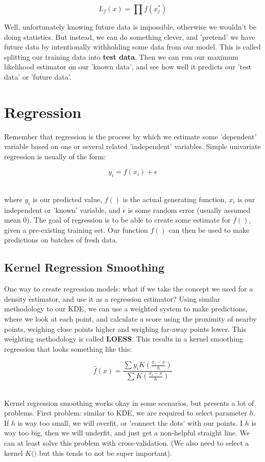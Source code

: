 \documentclass[12pt]{article}
\begin{document}
$$L_f(x) = \prod f(x^*_j)$$ 

Well, unfortunately knowing future data is impossible, otherwise we wouldn't be doing statistics. But instead, we can do something clever, and 'pretend' we have future data by intentionally withholding some data from our model. This is called splitting our training data into \textbf{test data}. Then we can run our maximum likelihood estimator on our 'known data', and see how well it predicts our 'test data' or 'future data'. 

\section{Regression}

Remember that regression is the process by which we estimate some 'dependent' variable based on one or several related 'independent' variables. Simple univariate regression is usually of the form: 

$$y_i = f(x_i) + \epsilon $$ \

where $y_i$ is our predicted value, $f()$ is the actual generating function, $x_i$ is our independent or 'known' variable, and $\epsilon$ is some random error (usually assumed mean 0). The goal of regression is to be able to create some estimate for $f()$, given a pre-existing training set. Our function $f()$ can then be used to make predictions on batches of fresh data.\\

\subsection{Kernel Regression Smoothing}
One way to create regression models: what if we take the concept we used for a density estimator, and use it as a regression estimator? Using similar methodology to our KDE, we can use a weighted system to make predictions, where we look at each point, and calculate a score using the proximity of nearby points, weighing close points higher and weighing far-away points lower. This weighting methodology is called \textbf{LOESS}. This results in a kernel smoothing regression that looks something like this:

$$\hat{f}(x) = \frac { \sum y_i K (\frac{x_i-x}{h}) } { \sum K (\frac{x_i-x}{h}) } $$ \

Kernel regression smoothing works okay in some scenarios, but presents a lot of problems. First problem: similar to KDE, we are required to select parameter $h$. If $h$ is way too small, we will overfit, or 'connect the dots' with our points. I $h$ is way too big, then we will underfit, and just get a non-helpful straight line. We can at least solve this problem with cross-validation. (We also need to select a kernel $K(\dot)$ but this tends to not be super important).\\
\end{document}

